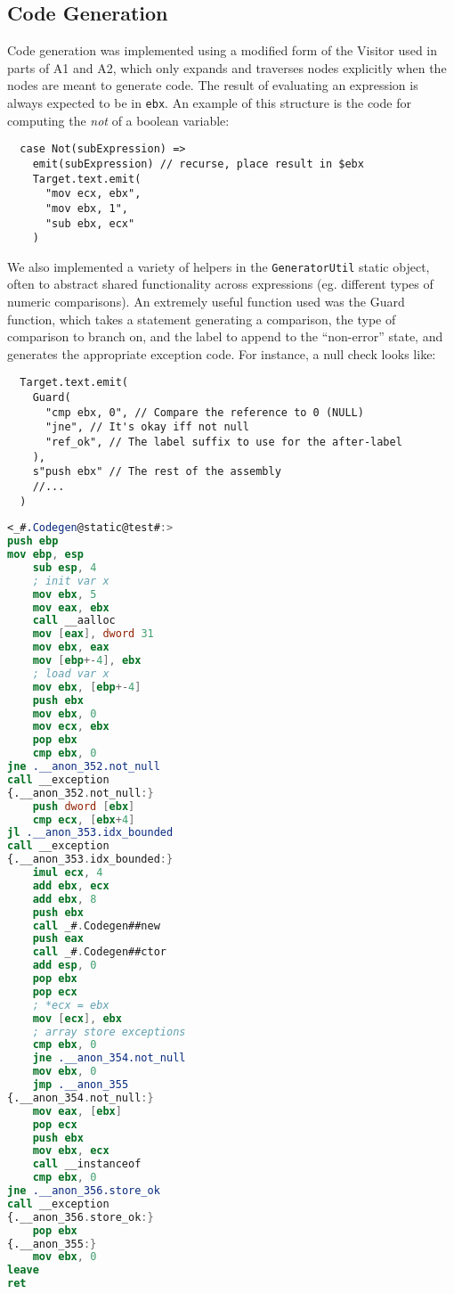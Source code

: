 \documentclass{article}
\begin{document}
\subsection{Code Generation}
Code generation was implemented using a modified form of the Visitor used in parts of A1 and A2, which only expands and traverses nodes explicitly when the nodes are meant to generate code. The result of evaluating an expression is always expected to be in \texttt{ebx}. An example of this structure is the code for computing the \emph{not} of a boolean variable:
\begin{lstlisting}
  case Not(subExpression) =>
    emit(subExpression) // recurse, place result in $ebx
    Target.text.emit(
      "mov ecx, ebx",
      "mov ebx, 1",
      "sub ebx, ecx"
    )
\end{lstlisting}
We also implemented a variety of helpers in the \texttt{GeneratorUtil} static object, often to abstract shared functionality across expressions (eg. different types of numeric comparisons). An extremely useful function used was the Guard function, which takes a statement generating a comparison, the type of comparison to branch on, and the label to append to the ``non-error'' state, and generates the appropriate exception code. For instance, a null check looks like:
\begin{lstlisting}
  Target.text.emit(
    Guard(
      "cmp ebx, 0", // Compare the reference to 0 (NULL)
      "jne", // It's okay iff not null
      "ref_ok", // The label suffix to use for the after-label
    ),
    s"push ebx" // The rest of the assembly
    //...
  )
\end{lstlisting}
\begin{lstlisting}[language=nasm]
<_#.Codegen@static@test#:>
push ebp
mov ebp, esp
    sub esp, 4
    ; init var x
    mov ebx, 5
    mov eax, ebx
    call __aalloc
    mov [eax], dword 31
    mov ebx, eax
    mov [ebp+-4], ebx
    ; load var x
    mov ebx, [ebp+-4]
    push ebx
    mov ebx, 0
    mov ecx, ebx
    pop ebx
    cmp ebx, 0
jne .__anon_352.not_null
call __exception
{.__anon_352.not_null:}
    push dword [ebx]
    cmp ecx, [ebx+4]
jl .__anon_353.idx_bounded
call __exception
{.__anon_353.idx_bounded:}
    imul ecx, 4
    add ebx, ecx
    add ebx, 8
    push ebx
    call _#.Codegen##new
    push eax
    call _#.Codegen##ctor
    add esp, 0
    pop ebx
    pop ecx
    ; *ecx = ebx
    mov [ecx], ebx
    ; array store exceptions
    cmp ebx, 0
    jne .__anon_354.not_null
    mov ebx, 0
    jmp .__anon_355
{.__anon_354.not_null:}
    mov eax, [ebx]
    pop ecx
    push ebx
    mov ebx, ecx
    call __instanceof
    cmp ebx, 0
jne .__anon_356.store_ok
call __exception
{.__anon_356.store_ok:}
    pop ebx
{.__anon_355:}
    mov ebx, 0
leave
ret
\end{lstlisting}
\end{document}
